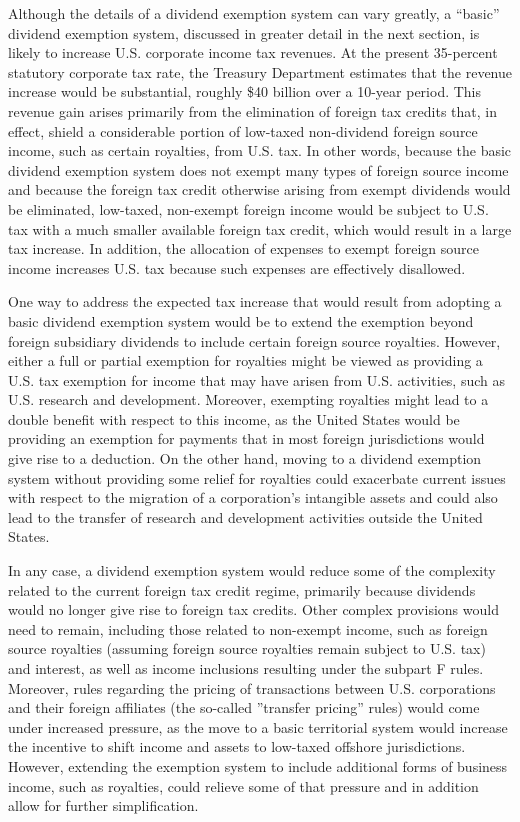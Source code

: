 \begin{select}
Although the details of a dividend exemption system can vary greatly, a ``basic'' 
dividend exemption system, discussed in greater detail in the next section, is likely to 
increase U.S. corporate income tax revenues.  At the present 35-percent statutory 
corporate tax rate, the Treasury Department estimates that the revenue increase would be 
substantial, roughly \$40 billion over a 10-year period.  This revenue gain arises primarily 
from the elimination of foreign tax credits that, in effect, shield a considerable portion of 
low-taxed non-dividend foreign source income, such as certain royalties, from U.S. tax.  
In other words, because the basic dividend exemption system does not exempt many 
types of foreign source income and because the foreign tax credit otherwise arising from 
exempt dividends would be eliminated, low-taxed, non-exempt foreign income would be 
subject to U.S. tax with a much smaller available foreign tax credit, which would result in 
a large tax increase.  In addition, the allocation of expenses to exempt foreign source 
income increases U.S. tax because such expenses are effectively disallowed.  
 
One way to address the expected tax increase that would result from adopting a 
basic dividend exemption system would be to extend the exemption beyond foreign 
subsidiary dividends to include certain foreign source royalties.  However, either a full or 
partial exemption for royalties might be viewed as providing a U.S. tax exemption for 
income that may have arisen from U.S. activities, such as U.S. research and development.  
Moreover, exempting royalties might lead to a double benefit with respect to this income, 
as the United States would be providing an exemption for payments that in most foreign 
jurisdictions would give rise to a deduction.  On the other hand, moving to a dividend 
exemption system without providing some relief for royalties could exacerbate current 
issues with respect to the migration of a corporation's intangible assets and could also 
lead to the transfer of research and development activities outside the United States. 
                                                 
In any case, a dividend exemption system would reduce some of the complexity 
related to the current foreign tax credit regime, primarily because dividends would no 
longer give rise to foreign tax credits.  Other complex provisions would need to remain, 
including those related to non-exempt income, such as foreign source royalties (assuming 
foreign source royalties remain subject to U.S. tax) and interest, as well as income 
inclusions resulting under the subpart F rules.  Moreover, rules regarding the pricing of 
transactions between U.S. corporations and their foreign affiliates (the so-called ''transfer 
pricing'' rules) would come under increased pressure, as the move to a basic territorial 
system would increase the incentive to shift income and assets to low-taxed offshore 
jurisdictions.  However, extending the exemption system to include additional forms of 
business income, such as royalties, could relieve some of that pressure and in addition 
allow for further simplification.   
 

\end{select}
